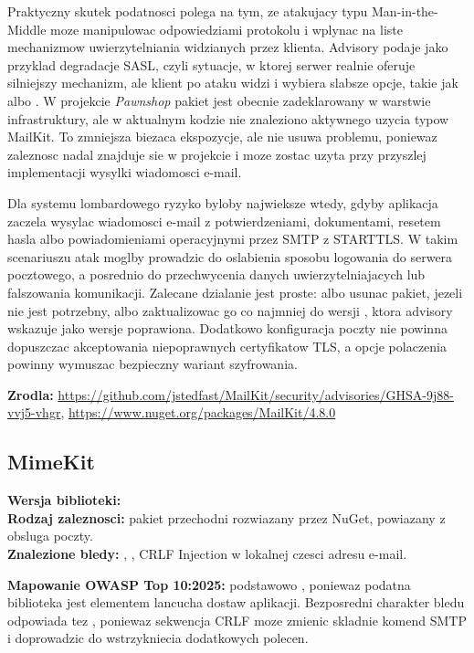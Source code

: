 \documentclass[12pt,a4paper]{article}
\begin{document}
Praktyczny skutek podatnosci polega na tym, ze atakujacy typu Man-in-the-Middle moze manipulowac odpowiedziami protokolu i wplynac na liste mechanizmow uwierzytelniania widzianych przez klienta. Advisory podaje jako przyklad degradacje SASL, czyli sytuacje, w ktorej serwer realnie oferuje silniejszy mechanizm, ale klient po ataku widzi i wybiera slabsze opcje, takie jak  albo . W projekcie \textit{Pawnshop} pakiet jest obecnie zadeklarowany w warstwie infrastruktury, ale w aktualnym kodzie nie znaleziono aktywnego uzycia typow MailKit. To zmniejsza biezaca ekspozycje, ale nie usuwa problemu, poniewaz zaleznosc nadal znajduje sie w projekcie i moze zostac uzyta przy przyszlej implementacji wysylki wiadomosci e-mail.

Dla systemu lombardowego ryzyko byloby najwieksze wtedy, gdyby aplikacja zaczela wysylac wiadomosci e-mail z potwierdzeniami, dokumentami, resetem hasla albo powiadomieniami operacyjnymi przez SMTP z STARTTLS. W takim scenariuszu atak moglby prowadzic do oslabienia sposobu logowania do serwera pocztowego, a posrednio do przechwycenia danych uwierzytelniajacych lub falszowania komunikacji. Zalecane dzialanie jest proste: albo usunac pakiet, jezeli nie jest potrzebny, albo zaktualizowac go co najmniej do wersji , ktora advisory wskazuje jako wersje poprawiona. Dodatkowo konfiguracja poczty nie powinna dopuszczac akceptowania niepoprawnych certyfikatow TLS, a opcje polaczenia powinny wymuszac bezpieczny wariant szyfrowania.

\textbf{Zrodla:} \url{https://github.com/jstedfast/MailKit/security/advisories/GHSA-9j88-vvj5-vhgr}, \url{https://www.nuget.org/packages/MailKit/4.8.0}

\clearpage
\subsection{MimeKit}

\textbf{Wersja biblioteki:} \\
\textbf{Rodzaj zaleznosci:} pakiet przechodni rozwiazany przez NuGet, powiazany z obsluga poczty.\\
\textbf{Znalezione bledy:} , , CRLF Injection w lokalnej czesci adresu e-mail.

\textbf{Mapowanie OWASP Top 10:2025:} podstawowo , poniewaz podatna biblioteka jest elementem lancucha dostaw aplikacji. Bezposredni charakter bledu odpowiada tez , poniewaz sekwencja CRLF moze zmienic skladnie komend SMTP i doprowadzic do wstrzykniecia dodatkowych polecen.
\end{document}
